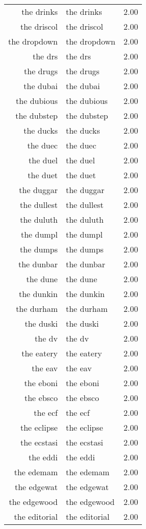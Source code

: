 \begin{table}[ht]
\begin{tabular}{rlr}
  the drinks & the drinks & 2.00 \\ 
  the driscol & the driscol & 2.00 \\ 
  the dropdown & the dropdown & 2.00 \\ 
  the drs & the drs & 2.00 \\ 
  the drugs & the drugs & 2.00 \\ 
  the dubai & the dubai & 2.00 \\ 
  the dubious & the dubious & 2.00 \\ 
  the dubstep & the dubstep & 2.00 \\ 
  the ducks & the ducks & 2.00 \\ 
  the duec & the duec & 2.00 \\ 
  the duel & the duel & 2.00 \\ 
  the duet & the duet & 2.00 \\ 
  the duggar & the duggar & 2.00 \\ 
  the dullest & the dullest & 2.00 \\ 
  the duluth & the duluth & 2.00 \\ 
  the dumpl & the dumpl & 2.00 \\ 
  the dumps & the dumps & 2.00 \\ 
  the dunbar & the dunbar & 2.00 \\ 
  the dune & the dune & 2.00 \\ 
  the dunkin & the dunkin & 2.00 \\ 
  the durham & the durham & 2.00 \\ 
  the duski & the duski & 2.00 \\ 
  the dv & the dv & 2.00 \\ 
  the eatery & the eatery & 2.00 \\ 
  the eav & the eav & 2.00 \\ 
  the eboni & the eboni & 2.00 \\ 
  the ebsco & the ebsco & 2.00 \\ 
  the ecf & the ecf & 2.00 \\ 
  the eclipse & the eclipse & 2.00 \\ 
  the ecstasi & the ecstasi & 2.00 \\ 
  the eddi & the eddi & 2.00 \\ 
  the edemam & the edemam & 2.00 \\ 
  the edgewat & the edgewat & 2.00 \\ 
  the edgewood & the edgewood & 2.00 \\ 
  the editorial & the editorial & 2.00 \\ 

\end{tabular}
\end{table}
